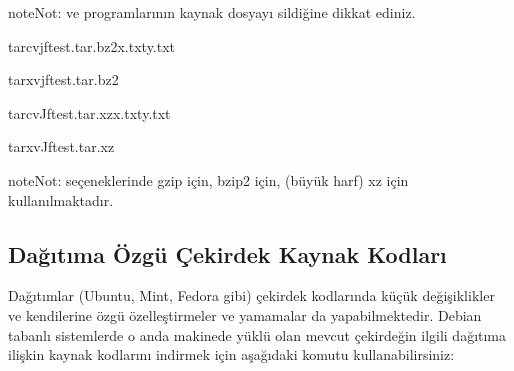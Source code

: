 \documentclass[a4paper,10pt,turkish]{sphinxmanual}
\begin{document}
\begin{sphinxadmonition}{note}{Not:}
\sphinxAtStartPar
{} ve  programlarının kaynak dosyayı sildiğine dikkat ediniz.
\end{sphinxadmonition}

\sphinxAtStartPar
{}

\begin{sphinxVerbatim}[commandchars=\\\{\}]
\PYGZdl{}tar\PYGZhy{}cvjftest.tar.bz2x.txty.txt

\PYGZdl{}tar\PYGZhy{}xvjftest.tar.bz2
\end{sphinxVerbatim}

\sphinxAtStartPar
{}

\begin{sphinxVerbatim}[commandchars=\\\{\}]
\PYGZdl{}tar\PYGZhy{}cvJftest.tar.xzx.txty.txt

\PYGZdl{}tar\PYGZhy{}xvJftest.tar.xz
\end{sphinxVerbatim}

\begin{sphinxadmonition}{note}{Not:}
\sphinxAtStartPar
{} seçeneklerinde  gzip için,  bzip2 için,  (büyük harf) xz için
kullanılmaktadır.
\end{sphinxadmonition}


\subsection{Dağıtıma Özgü Çekirdek Kaynak Kodları}
\label{\detokenize{kernelcompilation:dagitima-ozgu-cekirdek-kaynak-kodlari}}
\sphinxAtStartPar
Dağıtımlar (Ubuntu, Mint, Fedora gibi) çekirdek kodlarında küçük değişiklikler ve kendilerine özgü
özelleştirmeler ve yamamalar da yapabilmektedir. Debian tabanlı sistemlerde o anda makinede yüklü olan
mevcut çekirdeğin ilgili dağıtıma ilişkin kaynak kodlarını indirmek için aşağıdaki komutu
kullanabilirsiniz:
\end{document}
